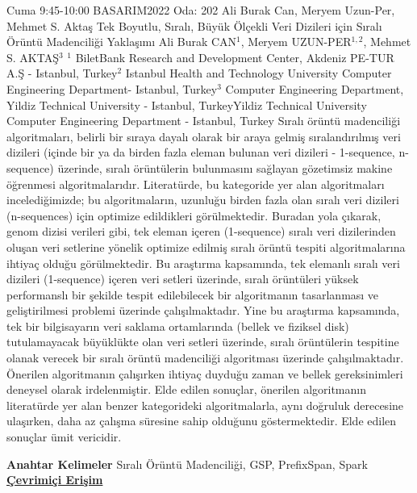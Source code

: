 
    \begin{abstract_basarim}
    {Cuma 9:45-10:00}
    {BASARIM2022}
    {Oda: 202}
    {Ali Burak Can, Meryem Uzun-Per, Mehmet S. Aktaş}
    {Tek Boyutlu, Sıralı, Büyük Ölçekli Veri Dizileri için Sıralı Örüntü Madenciliği Yaklaşımı}
    {%
    Ali Burak CAN$^{1}$, Meryem UZUN-PER$^{1,2}$, Mehmet S. AKTAŞ$^{3}$}
    {%
    }
    {%
    $^1$ BiletBank Research and Development Center, Akdeniz PE-TUR A.Ş - Istanbul, Turkey\newline{}$^2$ Istanbul Health and Technology University Computer Engineering Department- Istanbul, Turkey\newline{}$^3$ Computer Engineering Department, Yildiz Technical University - Istanbul, TurkeyYildiz Technical University Computer Engineering Department - Istanbul, Turkey}
    Sıralı örüntü madenciliği algoritmaları, belirli bir sıraya dayalı olarak bir araya gelmiş sıralandırılmış veri dizileri (içinde bir ya da birden fazla eleman bulunan veri dizileri - 1-sequence, n-sequence) üzerinde, sıralı örüntülerin bulunmasını sağlayan gözetimsiz makine öğrenmesi algoritmalarıdır. Literatürde, bu kategoride yer alan algoritmaları incelediğimizde; bu algoritmaların, uzunluğu birden fazla olan sıralı veri dizileri (n-sequences) için optimize edildikleri görülmektedir. Buradan yola çıkarak, genom dizisi verileri gibi, tek eleman içeren (1-sequence) sıralı veri dizilerinden oluşan veri setlerine yönelik optimize edilmiş sıralı örüntü tespiti algoritmalarına ihtiyaç olduğu görülmektedir. Bu araştırma kapsamında, tek elemanlı sıralı veri dizileri (1-sequence) içeren veri setleri üzerinde, sıralı örüntüleri yüksek performanslı bir şekilde tespit edilebilecek bir algoritmanın tasarlanması ve geliştirilmesi problemi üzerinde çalışılmaktadır. Yine bu araştırma kapsamında, tek bir bilgisayarın veri saklama ortamlarında (bellek ve fiziksel disk) tutulamayacak büyüklükte olan veri setleri üzerinde, sıralı örüntülerin tespitine olanak verecek bir sıralı örüntü madenciliği algoritması üzerinde çalışılmaktadır. Önerilen algoritmanın çalışırken ihtiyaç duyduğu zaman ve bellek gereksinimleri deneysel olarak irdelenmiştir. Elde edilen sonuçlar, önerilen algoritmanın literatürde yer alan benzer kategorideki algoritmalarla, aynı doğruluk derecesine ulaşırken, daha az çalışma süresine sahip olduğunu göstermektedir. Elde edilen sonuçlar ümit vericidir. 
    
            \textbf{Anahtar Kelimeler} \newline{}Sıralı Örüntü Madenciliği, GSP, PrefixSpan, Spark
     \newline\newline\noindent \href{https://drive.google.com/file/d/15N3cDtaLREa8d38d7DkDc978Qf9Gd-fd/view?usp=drivesdk}{\bfseries Çevrimiçi Erişim}
    \end{abstract_basarim}
    